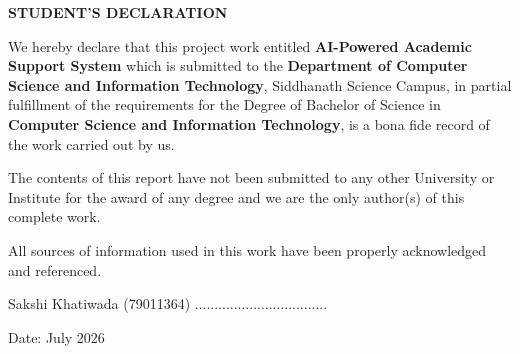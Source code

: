 
\thispagestyle{plain}

\begin{center}

\UniversityHeader
{\Large\bfseries
STUDENT'S DECLARATION
}

\end{center}

\vspace{0.8cm}

We hereby declare that this project work entitled
\textbf{AI-Powered Academic Support System}
which is submitted to the
\textbf{Department of Computer Science and Information Technology},
Siddhanath Science Campus,
in partial fulfillment of the requirements for the Degree of
Bachelor of Science in \textbf{Computer Science and Information Technology},
is a bona fide record of the work carried out by us.

The contents of this report have not been submitted to any other University or Institute for the award of any degree and we are the only author(s) of this complete work.

All sources of information used in this work have been properly acknowledged and referenced.

\vspace{1cm}

\begin{flushleft}

Sakshi Khatiwada \hfill (79011364) \hfill ..................................

\vspace{1cm}

Date: July 2026

\end{flushleft}